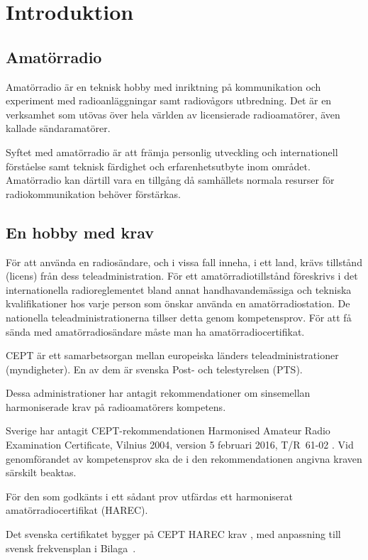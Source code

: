 \chapter*{Introduktion}

\section*{Amatörradio}

Amatörradio är en teknisk hobby med inriktning på kommunikation och experiment
med radioanläggningar samt radiovågors utbredning.
Det är en verksamhet som utövas över hela världen av licensierade radioamatörer,
även kallade sändaramatörer.

Syftet med amatörradio är att främja personlig utveckling och internationell
förståelse samt teknisk färdighet och erfarenhetsutbyte inom området.
Amatörradio kan därtill vara en tillgång då samhällets normala resurser för
radiokommunikation behöver förstärkas.

\section*{En hobby med krav}

För att använda en radiosändare, och i vissa fall inneha, i ett land, krävs
tillstånd (licens) från dess teleadministration.
För ett amatörradiotillstånd föreskrivs i det internationella radioreglementet
\cite{ITU-RR} bland annat handhavandemässiga och tekniska kvalifikationer hos
varje person som önskar använda en amatörradiostation.
De nationella teleadministrationerna tillser detta genom kompetensprov.
För att få sända med amatörradiosändare måste man ha amatörradiocertifikat.

CEPT är ett samarbetsorgan mellan europeiska länders teleadministrationer
(myndigheter).
En av dem är svenska Post- och telestyrelsen (PTS).

Dessa administrationer har antagit rekommendationer om sinsemellan
harmoniserade krav på radioamatörers kompetens.

Sverige har antagit CEPT-rekom\-men\-da\-ti\-on\-en
 Ha\-rmonised Amateur Radio Examination
Certificate, Vilnius 2004, version 5 februari 2016, T/R~61-02 \cite{TR6102}.
Vid genomförandet av kompetensprov ska de i den rekommendationen
angivna kraven särskilt beaktas.

För den som godkänts i ett sådant prov utfärdas ett harmoniserat
amatörradiocertifikat (HAREC).

Det svenska certifikatet bygger på CEPT HAREC krav \cite{TR6102},
med anpassning till svensk frekvensplan i Bilaga~.

